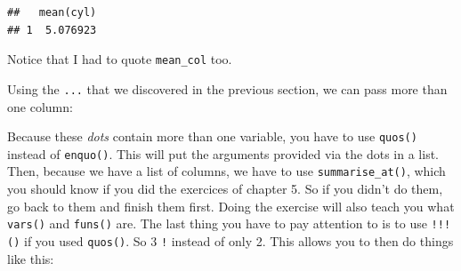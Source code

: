 \documentclass[]{gitbook}
\newenvironment{Shaded}{\begin{snugshade}}{\end{snugshade}}
\newcommand{\ControlFlowTok}[1]{\textcolor[rgb]{0.13,0.29,0.53}{\textbf{#1}}}
\newcommand{\DecValTok}[1]{\textcolor[rgb]{0.00,0.00,0.81}{#1}}
\newcommand{\KeywordTok}[1]{\textcolor[rgb]{0.13,0.29,0.53}{\textbf{#1}}}
\newcommand{\NormalTok}[1]{#1}
\newcommand{\OperatorTok}[1]{\textcolor[rgb]{0.81,0.36,0.00}{\textbf{#1}}}
\newcommand{\StringTok}[1]{\textcolor[rgb]{0.31,0.60,0.02}{#1}}
\theoremstyle{definition}
\theoremstyle{definition}
\theoremstyle{definition}
\theoremstyle{remark}
\begin{document}
\begin{Shaded}
\end{Shaded}

\begin{verbatim}
##   mean(cyl)
## 1  5.076923
\end{verbatim}

Notice that I had to quote \texttt{mean\_col} too.

Using the \texttt{...} that we discovered in the previous section, we
can pass more than one column:

\begin{Shaded}
\end{Shaded}

Because these \emph{dots} contain more than one variable, you have to
use \texttt{quos()} instead of \texttt{enquo()}. This will put the
arguments provided via the dots in a list. Then, because we have a list
of columns, we have to use \texttt{summarise\_at()}, which you should
know if you did the exercices of chapter 5. So if you didn't do them, go
back to them and finish them first. Doing the exercise will also teach
you what \texttt{vars()} and \texttt{funs()} are. The last thing you
have to pay attention to is to use \texttt{!!!()} if you used
\texttt{quos()}. So 3 \texttt{!} instead of only 2. This allows you to
then do things like this:
\end{document}
